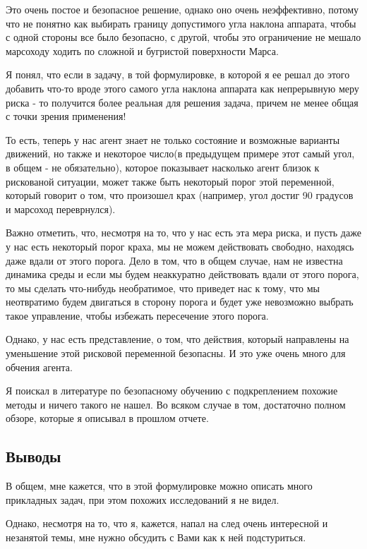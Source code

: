 \documentclass[a4paper]{article}
\begin{document}
Это очень постое и безопасное решение, однако оно очень неэффективно, потому что не понятно как выбирать границу допустимого угла наклона аппарата, чтобы с одной стороны все было безопасно, с другой, чтобы это ограничение не мешало марсоходу ходить по сложной и бугристой поверхности Марса.


Я понял, что если в задачу, в той формулировке, в которой я ее решал до этого добавить что-то вроде этого самого угла наклона аппарата как непрерывную меру риска - то получится более реальная для решения задача, причем не менее общая с точки зрения применения!

То есть, теперь у нас агент знает не только состояние и возможные варианты движений, но также и некоторое число(в предыдущем примере этот самый угол, в общем - не обязательно),  которое показывает насколько агент близок к рискованой ситуации, может также быть некоторый порог этой переменной, который говорит о том, что произошел крах (например, угол достиг 90 градусов и марсоход переврнулся).

Важно отметить, что, несмотря на то, что у нас есть эта мера риска, и пусть даже у нас есть некоторый порог краха, мы не можем действовать свободно, находясь даже вдали от этого порога. Дело в том, что в общем случае, нам не известна динамика среды и если мы будем неаккуратно действовать вдали от этого порога, то мы сделать что-нибудь необратимое, что приведет нас к тому, что мы неотвратимо будем двигаться в сторону порога и будет уже невозможно выбрать такое управление, чтобы избежать пересечение этого порога.

Однако, у нас есть представление, о том, что действия, который направлены на уменьшение этой рисковой переменной безопасны. И это уже очень много для обчения агента.


Я поискал в литературе по безопасному обучению с подкреплением похожие методы и ничего такого не нашел. Во всяком случае в том, достаточно полном обзоре, которые я описывал в прошлом отчете.

\subsection{Выводы}
В общем, мне кажется, что в этой формулировке можно описать много прикладных задач, при этом похожих исследований я не видел.

Однако, несмотря на то, что я, кажется, напал на след очень интересной и незанятой темы, мне нужно обсудить с Вами как к ней подстуриться.
\end{document}
